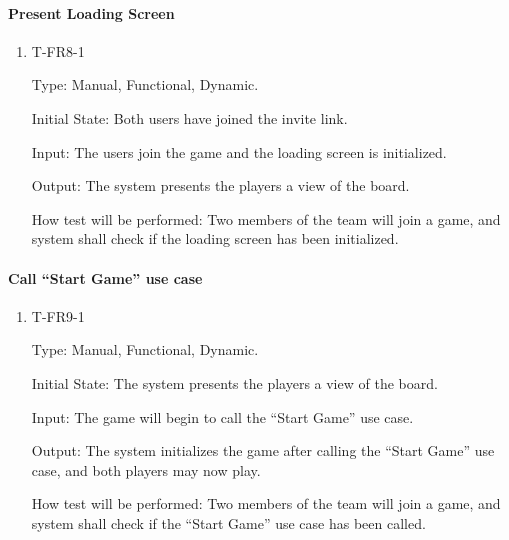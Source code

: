 \documentclass[12pt, titlepage]{article}
\begin{document}
    \paragraph{Present Loading Screen}

        \begin{enumerate}

        \item{T-FR8-1\\}

            Type: Manual, Functional, Dynamic.
            					
            Initial State: Both users have joined the invite link.
            					
            Input: The users join the game and the loading screen is initialized.
            					
            Output: The system presents the players a view of the board.
            					
            How test will be performed: Two members of the team will join a game, and system shall check if the loading screen has been initialized.

        \end{enumerate}
            
    \paragraph{Call ``Start Game'' use case}

        \begin{enumerate}

        \item{T-FR9-1\\}

            Type: Manual, Functional, Dynamic.
            					
            Initial State: The system presents the players a view of the board.
            					
            Input: The game will begin to call the ``Start Game'' use case.
            					
            Output: The system initializes the game after calling the ``Start Game'' use case, and both players may now play.
            					
            How test will be performed: Two members of the team will join a game, and system shall check if the ``Start Game'' use case has been called.

        \end{enumerate}
\end{document}
